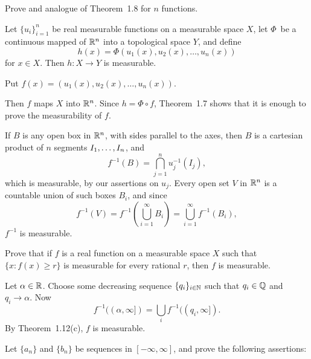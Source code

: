 \begin{enumerate}
\begin{excopy}
Prove and analogue of Theorem~1.8 for $n$ functions.
\end{excopy}

\begin{lthm}
Let \(\{u_i\}_{i=1}^n\) be real measurable functions on a measurable
space $X$, let
\(\Phi\)\ be a continuous mapped of \(\mathbb{R}^n\) into a topological space $Y$,
and define
\begin{equation*}
h(x) = \Phi(u_1(x),u_2(x),\ldots,u_n(x))
\end{equation*}
for \(x\in X\). Then \(h: X\to Y\) is measurable.
\end{lthm}
\begin{thmproof}
Put \(f(x) = (u_1(x),u_2(x),\ldots,u_n(x))\).

Then $f$ maps $X$ into \(\mathbb{R}^n\). Since
\(h = \Phi\circ f\), Theorem~1.7 shows that it is enough to prove
the measurability of $f$.

If $B$ is any open box in \(\mathbb{R}^n\), with sides parallel to the axes,
then $B$ is a cartesian product of $n$ segments \(I_1,\ldots,I_{n}\), and
\begin{equation*}
f^{-1}(B) = \bigcap_{j=1}^n u_j^{-1}(I_j),
\end{equation*}
which is measurable, by our assertions on \(u_j\).
Every open set $V$ in \(\mathbb{R}^n\) is a countable union of such boxes \(B_i\),
and since
\begin{equation*}
f^{-1}(V) = f^{-1}\left(\bigcup_{i=1}^\infty B_i\right)
          = \bigcup_{i=1}^\infty f^{-1}(B_i),
\end{equation*}
\(f^{-1}\) is measurable.
\end{thmproof}

\begin{excopy}
Prove that if $f$ is a real function on a measurable space $X$
such that \(\{x:f(x)\geq r\}\) is measurable for every rational $r$,
then $f$ is measurable.
\end{excopy}

Let \(\alpha\in \mathbb{R}\). Choose some decreasing sequence \(\{q_i\}_{i\in\mathbb{N}}\)
such that \(q_i\in\mathbb{Q}\) and \(q_i\to\alpha\). Now
\begin{equation*}
f^{-1}((\alpha,\infty]) = \bigcup_{i} f^{-1}((q_i,\infty]).
\end{equation*}
By Theorem~1.12(c), $f$ is measurable.

\begin{excopy}
Let \(\{a_n\}\) and \(\{b_n\}\) be sequences in \([-\infty,\infty]\),
and prove the following assertions:


\end{excopy}
\end{enumerate}
